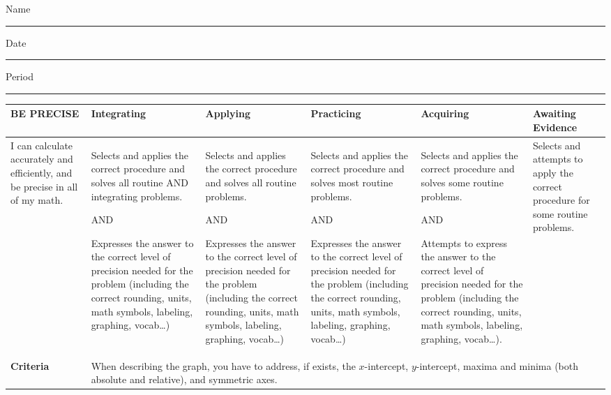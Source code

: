 \documentclass[10pt]{article}
\title{}
\date{}
\begin{document}
\noindent
{\large
Name \rule{16em}{.5pt} Date \rule{8em}{.5pt} Period \rule{2em}{.5pt}
}
\vspace{1em}

\begingroup
\renewcommand{\arraystretch}{1.5}
\begin{center}
{
\begin{tabularx}{\textwidth}{|X|X|X|X|X|X|}
\hline
\bf BE PRECISE & \centerline{Integrating} & \centerline{Applying} & \centerline{Practicing} & \centerline{Acquiring} & \centerline{Awaiting Evidence} \\
\hline
I can calculate accurately and efficiently, and be precise in all of my math.&
Selects and applies the correct procedure and solves all routine AND integrating problems.

AND

Expresses the answer to the correct level of precision needed for the problem (including the correct rounding, units, math symbols, labeling, graphing, vocab…)
&Selects and applies the correct procedure and solves all routine problems.


AND

Expresses the answer to the correct level of precision needed for the problem (including the correct rounding, units, math symbols, labeling, graphing, vocab…)
&Selects and applies the correct procedure and solves most routine problems.


AND

Expresses the answer to the correct level of precision needed for the problem (including the correct rounding, units, math symbols, labeling, graphing, vocab…)
&Selects and applies the correct procedure and solves some routine problems.


AND

Attempts to express the answer to the correct level of precision needed for the problem (including the correct rounding, units, math symbols, labeling, graphing, vocab…).
&Selects and attempts to apply the correct procedure for some routine problems.\\
\hline
\bf Criteria&\multicolumn{5}{l|}{\parbox[c][4em]{.8\textwidth}{When describing the graph, you have to address, if exists, the $x$-intercept, $y$-intercept, maxima and minima (both absolute and relative), and symmetric axes.}}\\
\hline
\end{tabularx}
}
\end{center}
\endgroup
\vspace{2em}
\end{document}
